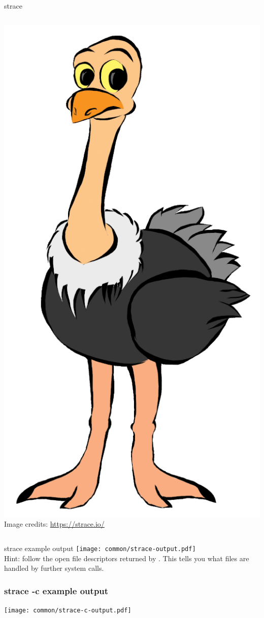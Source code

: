\begin{frame}[fragile]{strace}
\begin{columns}
  \includegraphics[height=0.7\textheight]{common/strace-mascot.png}\\
  \tiny Image credits: \url{https://strace.io/}
  \end{columns}
\end{frame}

\begin{frame}[fragile]{strace example output}
  \texttt{[image: common/strace-output.pdf]}\\
  Hint: follow the open file descriptors returned by .
  This tells you what files are handled by further system calls.
\end{frame}

\begin{frame}[fragile]
  \frametitle{strace -c example output}
  \texttt{[image: common/strace-c-output.pdf]}
\end{frame}
